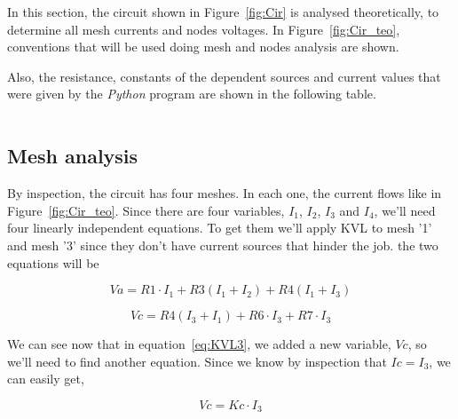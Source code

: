 \par In this section, the circuit shown in Figure~\ref{fig:Cir} is analysed
theoretically, to determine all mesh currents and nodes voltages.
In Figure~\ref{fig:Cir_teo}, conventions that will be used doing mesh and nodes analysis are shown.



\par Also, the resistance, constants of the dependent sources and current values that were given by the \emph{Python} program are shown in the following table.
\vspace{5mm}
\begin{table}[H]
\centering
\begin{tabularx}{0.8\textwidth} {
  | >{\raggedright\arraybackslash}X
  | >{\raggedleft\arraybackslash}X | }
 \hline

\end{tabularx}
\end{table}

\subsection{Mesh analysis}
\label{ssec:Mesh analysis}

\par By inspection, the circuit has four meshes. In each one, the current flows like in Figure~\ref{fig:Cir_teo}. Since there are four variables, $I_1$, $I_2$, $I_3$ and $I_4$, we'll need four linearly independent equations. To get them we'll apply KVL to mesh '1' and mesh '3' since they don't have current sources that hinder the job. the two equations will be

\begin{equation}
  Va = R1 \cdot I_1+R3(I_1 + I_2) + R4(I_1 + I_3)
  \label{eq:KVL1}
\end{equation}

\begin{equation}
  Vc = R4(I_3 + I_1) + R6 \cdot I_3 + R7 \cdot I_3
  \label{eq:KVL3}
\end{equation}

\par We can see now that in equation~\ref{eq:KVL3}, we added a new variable, $Vc$, so we'll need to find another equation. Since we know by inspection that $Ic=I_3$, we can easily get,

\begin{equation}
  Vc = Kc \cdot I_3
  \label{eq:Vc}
\end{equation}

